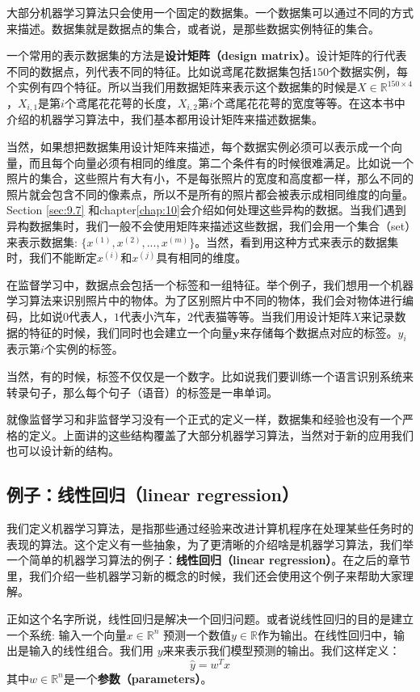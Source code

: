 大部分机器学习算法只会使用一个固定的数据集。一个数据集可以通过不同的方式来描述。数据集就是数据点的集合，或者说，是那些数据实例特征的集合。

一个常用的表示数据集的方法是\textbf{设计矩阵（design matrix）}。设计矩阵的行代表不同的数据点，列代表不同的特征。比如说鸢尾花数据集包括$150$个数据实例，每个实例有四个特征。所以当我们用数据矩阵来表示这个数据集的时候是$X\in \mathbb{R}^{150\times 4}$，$X_{i,1}$是第$i$个鸢尾花花萼的长度，$X_{i,2}$第$i$个鸢尾花花萼的宽度等等。在这本书中介绍的机器学习算法中，我们基本都用设计矩阵来描述数据集。

当然，如果想把数据集用设计矩阵来描述，每个数据实例必须可以表示成一个向量，而且每个向量必须有相同的维度。第二个条件有的时候很难满足。比如说一个照片的集合，这些照片有大有小，不是每张照片的宽度和高度都一样，那么不同的照片就会包含不同的像素点，所以不是所有的照片都会被表示成相同维度的向量。Section \ref{sec:9.7} 和chapter\ref{chap:10}会介绍如何处理这些异构的数据。当我们遇到异构数据集时，我们一般不会使用矩阵来描述这些数据，我们会用一个集合（set）来表示数据集: $\{x^{(1)},x^{(2)},...,x^{(m)}\}$。当然，看到用这种方式来表示的数据集时，我们不能断定$x^{(i)}$和$x^{(j)}$具有相同的维度。

在监督学习中，数据点会包括一个标签和一组特征。举个例子，我们想用一个机器学习算法来识别照片中的物体。为了区别照片中不同的物体，我们会对物体进行编码，比如说$0$代表人，$1$代表小汽车，$2$代表猫等等。当我们用设计矩阵$X$来记录数据的特征的时候，我们同时也会建立一个向量$\textbf{y}$来存储每个数据点对应的标签。$y_i$表示第$i$个实例的标签。

当然，有的时候，标签不仅仅是一个数字。比如说我们要训练一个语言识别系统来转录句子，那么每个句子（语音）的标签是一串单词。

就像监督学习和非监督学习没有一个正式的定义一样，数据集和经验也没有一个严格的定义。上面讲的这些结构覆盖了大部分机器学习算法，当然对于新的应用我们也可以设计新的结构。

\subsection{例子：线性回归（linear regression）}
\label{sec:5.1.4}
我们定义机器学习算法，是指那些通过经验来改进计算机程序在处理某些任务时的表现的算法。这个定义有一些抽象，为了更清晰的介绍啥是机器学习算法，我们举一个简单的机器学习算法的例子：\textbf{线性回归（linear regression）}。在之后的章节里，我们介绍一些机器学习新的概念的时候，我们还会使用这个例子来帮助大家理解。

正如这个名字所说，线性回归是解决一个回归问题。或者说线性回归的目的是建立一个系统: 输入一个向量$x\in \mathbb{R}^{n}$ 预测一个数值$y\in \mathbb{R}$作为输出。在线性回归中，输出是输入的线性组合。我们用 $y $来来表示我们模型预测的输出。我们这样定义：
\begin{equation}
    \hat{y}=w^{T}x
\end{equation}
其中$w\in \mathbb{R}^{n}$是一个\textbf{参数（parameters）}。
 
